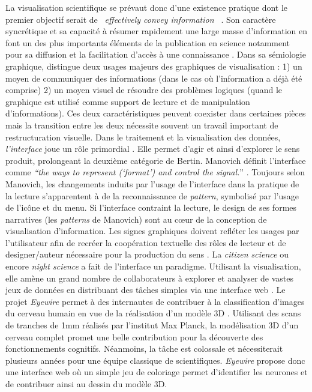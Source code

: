 La visualisation scientifique se prévaut donc d{\textquoteright}une existence pratique dont le premier objectif serait de \textit{{\guillemotleft}~effectively convey information~{\guillemotright}} \citep{Kelleher2011}. Son caractère syncrétique et sa capacité à résumer rapidement une large masse d{\textquoteright}information en font un des plus importants éléments de la publication en science notamment pour sa diffusion et la facilitation d{\textquoteright}accès à une connaissance \citep{Ware2004}. Dans sa sémiologie graphique, \cite{Bertin1977} distingue deux usages majeurs des graphiques de visualisation : 1) un moyen de communiquer des informations (dans le cas o\`u l{\textquoteright}information a déjà été comprise) 2) un moyen visuel de résoudre des problèmes logiques (quand le graphique est utilisé comme support de lecture et de manipulation d{\textquoteright}informations). Ces deux caractéristiques peuvent coexister dans certaines pièces mais la transition entre les deux nécessite souvent un travail important de restructuration visuelle. Dans le traitement et la visualisation des données, \textit{l{\textquoteright}interface} joue un r\^ole primordial \citep{Weissberg2007}. Elle permet d'agir et ainsi d'explorer le sens produit, prolongeant la deuxième catégorie de Bertin. Manovich définit l{\textquoteright}interface comme \textit{{\textquotedblleft}the ways to represent ({\textquoteleft}format{\textquoteright}) and control the signal.}{\textquotedblright} \citep{Manovich2013}. Toujours selon Manovich, les changements induits par l'usage de l'interface dans la pratique de la lecture s{\textquoteright}apparentent à de la reconnaissance de \textit{pattern}, symbolisé par l{\textquoteright}usage de l{\textquoteright}ic\^one et du menu. Si l{\textquoteright}interface contraint la lecture, le design de ses formes narratives (les \textit{patterns} de Manovich) sont au cœur de la conception de visualisation d{\textquoteright}information. Les signes graphiques doivent refléter les usages par l'utilisateur afin de recréer la coopération textuelle des r\^oles de lecteur et de designer/auteur nécessaire pour la production du sens \citep{Eco1985}. La \textit{citizen science} ou encore \textit{night science} a fait de l{\textquoteright}interface un paradigme. Utilisant la visualisation, elle amène un grand nombre de collaborateurs à explorer et analyser de vastes jeux de données en distribuant des t\^aches simples via une interface web \citep{Silvertown2009}. Le projet \textit{Eyewire} permet à des internautes de contribuer à la classification d{\textquoteright}images du cerveau humain en vue de la réalisation d{\textquoteright}un modèle 3D \citep{Seung2012}. Utilisant des scans de tranches de 1mm réalisés par l{\textquoteright}institut Max Planck, la modélisation 3D d{\textquoteright}un cerveau complet promet une belle contribution pour la découverte des fonctionnements cognitifs. Néanmoins, la t\^ache est colossale et nécessiterait plusieurs années pour une équipe classique de scientifiques. \textit{Eyewire} propose donc une interface web o\`u un simple jeu de coloriage permet d{\textquoteright}identifier les neurones et de contribuer ainsi au dessin du modèle 3D.


